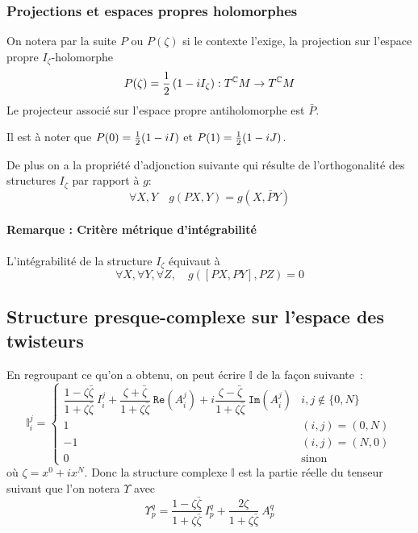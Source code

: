 \documentclass[12pt,draft]{article}
\renewcommand{\Re}{\texttt{Re}}
\renewcommand{\Im}{\texttt{Im}}
\begin{document}
\subsubsection{Projections et espaces propres holomorphes}
On notera par la suite $P$ ou $P(\zeta)$ si le contexte l'exige, la projection sur l'espace propre $I_\zeta$-holomorphe
\begin{equation}
P(\zeta) = \operatorname{\frac{1}{2}} \left( 1 - i I_\zeta \right) : T^{\mathbb{C}} M \rightarrow T^{\mathbb{C}} M
\end{equation} 
Le projecteur associé sur l'espace propre antiholomorphe est $\bar{P}$.

Il est à noter que $P(0) = \operatorname{\frac{1}{2}}(1-iI)$ et $P(1) = \operatorname{\frac{1}{2}}(1-iJ)$.

De plus on a la propriété d'adjonction suivante qui résulte de l'orthogonalité des structures $I_\zeta$ par rapport à $g$:
\begin{equation}\label{Padjoint}
\forall X,Y \quad g(PX,Y ) = g(X,\bar{P}Y)
\end{equation}

\paragraph*{Remarque : Critère métrique d'intégrabilité}
L'intégrabilité de la structure $I_\zeta$ équivaut à
\begin{equation}
\forall X , \forall Y, \forall Z , \quad  g([PX,PY],PZ) = 0
\end{equation}

\subsection{Structure presque-complexe sur l'espace des twisteurs}
En regroupant ce qu'on a obtenu, on peut écrire $\mathbb{I}$ de la façon suivante~:
\[
\mathbb{I}_i^j = \left\lbrace
\begin{array}{cr}
\dfrac{1-\zeta \bar{\zeta}}{1+\zeta \bar{\zeta}} \ I_i^j + \dfrac{\zeta + \bar{\zeta}}{1+\zeta \bar{\zeta}}\ \Re(A_i^j) + i\dfrac{\zeta - \bar{\zeta}}{1+\zeta \bar{\zeta}}\ \Im(A_i^j)  & i,j \notin \{0,N\}\\ 
1 & (i,j) = (0,N)\\
-1 & (i,j) = (N,0)\\
0 & \text{sinon}
\end{array}\right.
\]
où $\zeta = x^0+ix^N$.
Donc la structure complexe $\mathbb{I}$ est la partie réelle du tenseur suivant que l'on notera $\Upsilon$ avec
\[
\Upsilon_p^q = \dfrac{1-\zeta \bar{\zeta}}{1+\zeta \bar{\zeta}}\ I_p^q + \dfrac{2\zeta}{1+\zeta \bar{\zeta}}\ A_p^q
\]
\end{document}
